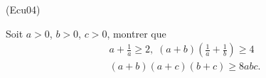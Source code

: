 \begin{tiny}(Ecu04)\end{tiny}
Soit $a>0$, $b>0$, $c>0$, montrer que
\begin{multline*}
a + \frac{1}{a}\geq 2,\; (a+b)(\frac{1}{a}+\frac{1}{b}) \geq 4 \\
(a+b)(a+c)(b+c) \geq 8abc.  
\end{multline*}
